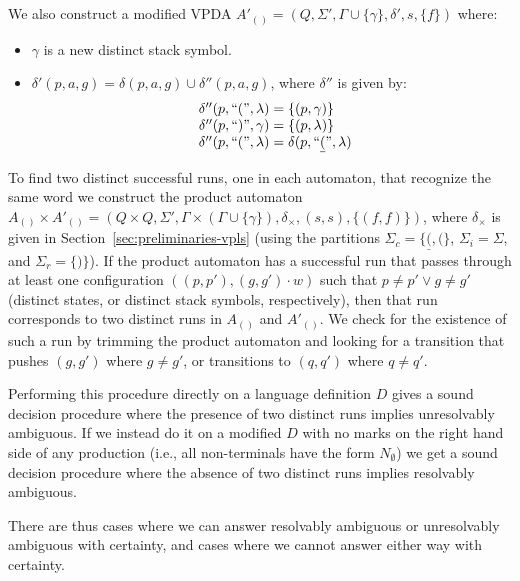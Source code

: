 \documentclass[acmsmall,review,anonymous]{acmart}\settopmatter{printfolios=true,printccs=false,printacmref=false}
\newcommand{\T}{\Sigma} %
\newcommand{\reqpl}{\underline{(}}
\newcommand{\reqpr}{)}
\newcommand{\pospl}{(}
\newcommand{\pospr}{)}
\newcommand{\posp}[1]{\pospl#1\pospr}
\begin{document}
\noindent We also construct a modified VPDA $A'_{\posp{}} = (Q, \T', \Gamma \cup \{\gamma\}, \delta', s, \{f\})$ where:

\begin{itemize}
\item $\gamma$ is a new distinct stack symbol.
\item $\delta'(p, a, g) = \delta(p, a, g) \cup \delta''(p, a, g)$, where $\delta''$ is given by:
  $$
  \begin{array}{r@{\;=\;}l@{}}
    \delta''(p, \text{``}\pospl\text{''}, \lambda)
    & \{ (p, \gamma) \} \\

    \delta''(p, \text{``}\pospr\text{''}, \gamma)
    & \{ (p, \lambda) \} \\

    \delta''(p, \text{``}\pospl\text{''}, \lambda)
    & \delta(p, \text{``}\reqpl\text{''}, \lambda) \\
  \end{array}
  $$
\end{itemize}

\noindent To find two distinct successful runs, one in each automaton, that recognize the same word we construct the product automaton $A_{\posp{}} \times A'_{\posp{}} = (Q \times Q, \T', \Gamma \times (\Gamma \cup \{\gamma\}), \delta_{\times}, (s, s), \{(f, f)\})$, where $\delta_{\times}$ is given in Section~\ref{sec:preliminaries-vpls} (using the partitions $\T_c = \{ \reqpl, \pospl \}$, $\T_i = \T$, and $\T_r = \{\reqpr\}$). If the product automaton has a successful run that passes through at least one configuration $((p, p'), (g, g')\cdot w)$ such that $p \neq p' \lor g \neq g'$ (distinct states, or distinct stack symbols, respectively), then that run corresponds to two distinct runs in $A_{\posp{}}$ and $A'_{\posp{}}$. We check for the existence of such a run by trimming the product automaton and looking for a transition that pushes $(g, g')$ where $g \neq g'$, or transitions to $(q, q')$ where $q \neq q'$.

Performing this procedure directly on a language definition $D$ gives a sound decision procedure where the presence of two distinct runs implies unresolvably ambiguous. If we instead do it on a modified $D$ with no marks on the right hand side of any production (i.e., all non-terminals have the form $N_\emptyset$) we get a sound decision procedure where the absence of two distinct runs implies resolvably ambiguous.

There are thus cases where we can answer resolvably ambiguous or unresolvably ambiguous with certainty, and cases where we cannot answer either way with certainty.
\end{document}
